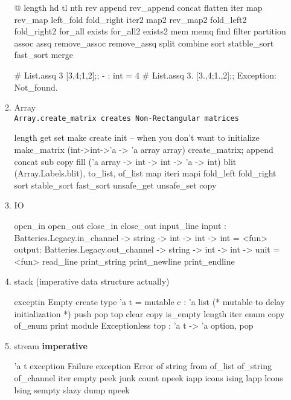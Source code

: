 \begin{enumerate}
\begin{enumerate}
\begin{bluecode}
      @ length hd tl nth rev append rev_append concat flatten
      iter map rev_map left_fold fold_right iter2 map2 rev_map2
      fold_left2 fold_right2 for_all exists for_all2 exists2 
      mem memq find filter partition assoc assq remove_assoc remove_assq
      split combine sort statble_sort fast_sort merge
    \end{bluecode}

\begin{alternate}    
# List.assq 3 [3,4;1,2];;
- : int = 4
# List.assq 3. [3.,4;1.,2];;
Exception: Not_found.
\end{alternate}

    \item Array \\
      \verb|Array.create_matrix creates Non-Rectangular matrices|

\begin{bluecode}
length get set make create init -- when you don't want to initialize
make_matrix (int->int->'a -> 'a array array) create_matrix;
append concat sub copy fill ('a array -> int -> int -> 'a -> int)
blit (Array.Labels.blit), to_list, of_list map iteri mapi fold_left
fold_right sort stable_sort fast_sort unsafe_get unsafe_set copy
\end{bluecode}

    \item IO \\

\begin{bluecode}
open_in open_out close_in close_out input_line
input : Batteries.Legacy.in_channel -> string -> int -> int -> int = <fun> 
output: Batteries.Legacy.out_channel -> string -> int -> int -> unit =<fun> 
read_line print_string print_newline print_endline
\end{bluecode}

    \item stack (imperative data structure actually)

\begin{bluecode}
exceptin Empty
create
type 'a t = { mutable c : 'a list }
(* mutable to delay initialization *)
push pop top clear copy is_empty length iter enum copy
of_enum print
module Exceptionless
  top : 'a t -> 'a option, pop
\end{bluecode}

    \item stream \textbf{imperative}

\begin{bluecode}
'a t
exception Failure
exception Error of string
from
of_list of_string of_channel iter empty peek junk count npeek
iapp icons ising lapp lcons lsing
sempty slazy dump npeek
\end{bluecode}


\end{enumerate}
\end{enumerate}

